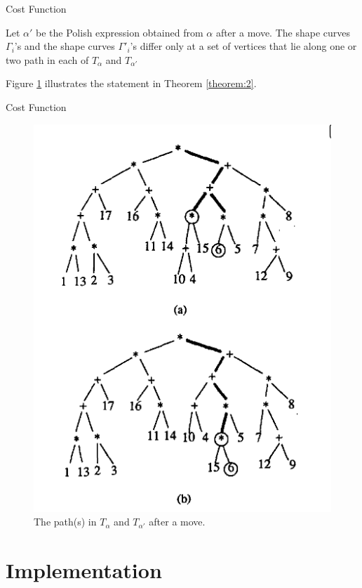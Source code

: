 \documentclass[xcolor=pdftex,dvipsnames,table]{beamer}
\begin{document}
\begin{frame}{Cost Function}
  \begin{theorem}\label{theorem:2}
    Let $\alpha'$ be the Polish expression obtained from $\alpha$ after a move. The shape curves $\Gamma_i$'s and the shape curves $\Gamma'_i$'s differ only at a set of vertices that lie along one or two path in each of $T_\alpha$ and $T_{\alpha'}$
  \end{theorem}

  Figure \ref{fig:6} illustrates the statement in Theorem \ref{theorem:2}.
\end{frame}

\begin{frame}{Cost Function}
  \begin{figure}
    \includegraphics[scale=0.4]{incremental_computation}
    \caption{The path(s) in $T_\alpha$ and $T_{\alpha'}$ after a move.}
    \label{fig:6}
  \end{figure}
\end{frame}

\section{Implementation}
\end{document}
